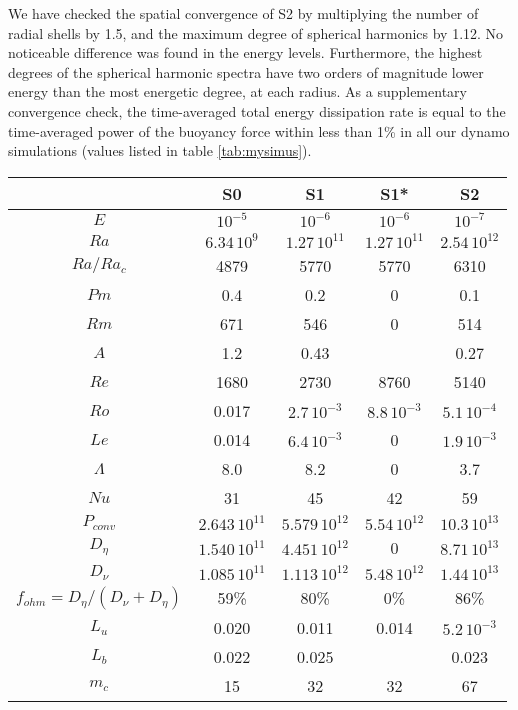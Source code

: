 \documentclass[12pt, a4paper]{article}
\begin{document}
We have checked the spatial convergence of S2 by multiplying the number of radial shells by 1.5, and the maximum degree of spherical harmonics by 1.12.
No noticeable difference was found in the energy levels.
Furthermore, the highest degrees of the spherical harmonic spectra have two orders of magnitude lower energy than the most energetic degree, at each radius.
As a supplementary convergence check, the time-averaged total energy dissipation rate is equal to the time-averaged power of the buoyancy force within less than 1\% in all our dynamo simulations (values listed in table \ref{tab:mysimus}).

\begin{table}
\begin{center}
\begin{tabular}{ccccc}
     &  \textbf{S0} & \textbf{S1} & \textbf{S1*} & \textbf{S2} \\
\hline
$E$ &  $10^{-5}$ & $10^{-6}$ & $10^{-6}$ & $10^{-7}$  \\
$Ra$ & $6.34\,10^{9}$ & $1.27\,10^{11}$ & $1.27\,10^{11}$ &  $2.54\,10^{12}$ \\
$Ra/Ra_c$ & 4879 & 5770 & 5770 & 6310 \\
$Pm$ & 0.4 & 0.2 & 0 & 0.1 \\
\hline
$Rm$ &  671 & 546 & 0  & 514 \\
$A$  &  1.2 & 0.43 & & 0.27 \\ 
$Re$ &  1680 & 2730 & 8760 & 5140 \\
$Ro$ & 0.017 & $2.7\,10^{-3}$ & $8.8\,10^{-3}$  & $5.1\,10^{-4}$ \\
$Le$ & 0.014 & $6.4\,10^{-3}$ & 0  & $1.9\,10^{-3}$\\
$\Lambda$ & 8.0 & 8.2 & 0 & 3.7 \\
\hline
$Nu$ & 31 & 45 & 42 & 59 \\
$P_{conv}$ & $2.643\, 10^{11}$ & $5.579 \, 10^{12}$ & $5.54 \, 10^{12}$ & $10.3 \, 10^{13}$\\
$D_\eta$ & $1.540\, 10^{11}$ & $4.451 \, 10^{12}$ & 0 & $8.71 \, 10^{13}$ \\
$D_\nu$ & $1.085\, 10^{11}$ & $1.113 \, 10^{12}$ & $5.48 \, 10^{12}$ & $1.44 \, 10^{13}$\\
$f_{ohm}=D_\eta/(D_\nu+D_\eta)$ & 59\% & 80\% & 0\%   & 86\%  \\
$L_u$ & 0.020 & 0.011 & 0.014 &  $5.2\,10^{-3}$ \\
$L_b$ & 0.022 & 0.025 & & 0.023 \\
$m_c$ & 15 & 32 & 32 & 67 \\

\end{tabular}
\end{center}
\end{table}
\end{document}
